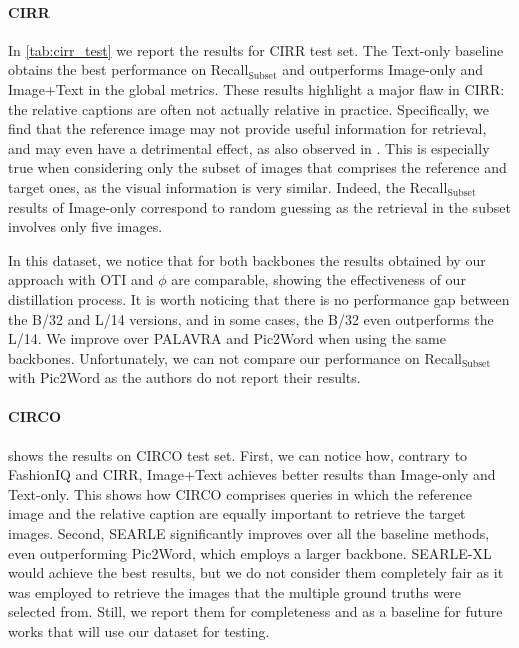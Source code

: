 \documentclass[10pt,twocolumn,letterpaper]{article}
\newcommand{\method}{SEARLE\xspace}
\begin{document}
\paragraph{CIRR} \label{sec:cirr_results}
In \cref{tab:cirr_test} we report the results for CIRR test set. The Text-only baseline obtains the best performance on Recall$_{\text{Subset}}$ and outperforms Image-only and Image+Text in the global metrics. These results highlight a major flaw in CIRR: the relative captions are often not actually relative in practice. Specifically, we find that the reference image may not provide useful information for retrieval, and may even have a detrimental effect, as also observed in \cite{saito2023pic2word}. This is especially true when considering only the subset of images that comprises the reference and target ones, as the visual information is very similar. Indeed, the Recall$_{\text{Subset}}$ results of Image-only correspond to random guessing as the retrieval in the subset involves only five images. 

In this dataset, we notice that for both backbones the results obtained by our approach with OTI and $\phi$ are comparable, showing the effectiveness of our distillation process. It is worth noticing that there is no performance gap between the B/32 and L/14 versions, and in some cases, the B/32 even outperforms the L/14. We improve over PALAVRA and Pic2Word when using the same backbones. Unfortunately, we can not compare our performance on Recall$_{\text{Subset}}$ with Pic2Word as the authors do not report their results.

\paragraph{CIRCO}
 shows the results on CIRCO test set. First, we can notice how, contrary to FashionIQ and CIRR, Image+Text achieves better results than Image-only and Text-only. This shows how CIRCO comprises queries in which the reference image and the relative caption are equally important to retrieve the target images. Second, \method significantly improves over all the baseline methods, even outperforming Pic2Word, which employs a larger backbone. \method-XL would achieve the best results, but we do not consider them completely fair as it was employed to retrieve the images that the multiple ground truths were selected from. Still, we report them for completeness and as a baseline for future works that will use our dataset for testing.
\end{document}
